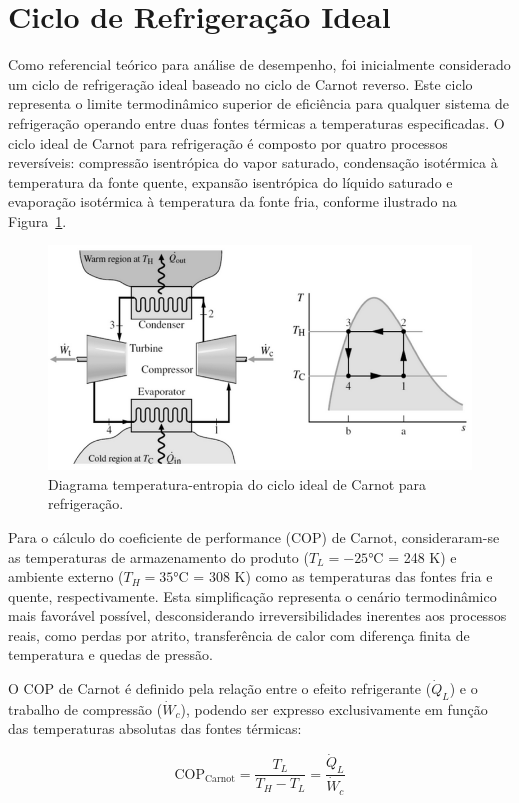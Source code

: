 \newpage

\section{Ciclo de Refrigeração Ideal}

Como referencial teórico para análise de desempenho, foi inicialmente considerado um ciclo de refrigeração ideal baseado no ciclo de Carnot reverso. Este ciclo representa o limite termodinâmico superior de eficiência para qualquer sistema de refrigeração operando entre duas fontes térmicas a temperaturas especificadas. O ciclo ideal de Carnot para refrigeração é composto por quatro processos reversíveis: compressão isentrópica do vapor saturado, condensação isotérmica à temperatura da fonte quente, expansão isentrópica do líquido saturado e evaporação isotérmica à temperatura da fonte fria, conforme ilustrado na Figura~\ref{fig: ciclo ideal}.

\begin{figure}[ht]
    \centering
    \includegraphics[width=0.6\linewidth]{Imagens/Desenvolvimento/carnot.png}
    \caption{Diagrama temperatura-entropia do ciclo ideal de Carnot para refrigeração.}
    \label{fig: ciclo ideal}
\end{figure}

Para o cálculo do coeficiente de performance (COP) de Carnot, consideraram-se as temperaturas de armazenamento do produto ($T_L = -25$°C = 248 K) e ambiente externo ($T_H = 35$°C = 308 K) como as temperaturas das fontes fria e quente, respectivamente. Esta simplificação representa o cenário termodinâmico mais favorável possível, desconsiderando irreversibilidades inerentes aos processos reais, como perdas por atrito, transferência de calor com diferença finita de temperatura e quedas de pressão.

O COP de Carnot é definido pela relação entre o efeito refrigerante ($\dot{Q}_L$) e o trabalho de compressão ($\dot{W}_c$), podendo ser expresso exclusivamente em função das temperaturas absolutas das fontes térmicas:

\begin{equation}
    \text{COP}_{\text{Carnot}} = \frac{T_L}{T_H - T_L} = \frac{\dot{Q}_L}{\dot{W}_c}
    \label{eq:cop carnot}
\end{equation}

